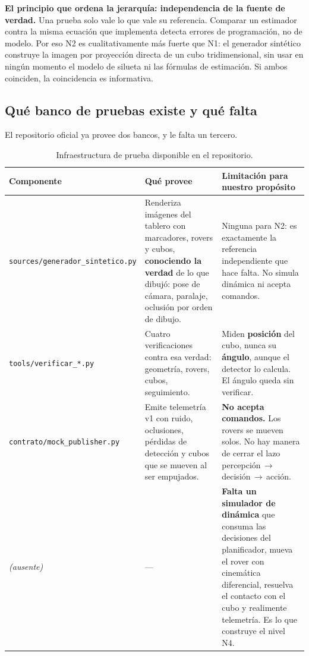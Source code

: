 \documentclass[11pt,a4paper]{article}
\begin{document}
\begin{tcolorbox}[colback=black!3,colframe=black!50,boxrule=0.5pt,arc=1pt]
\textbf{El principio que ordena la jerarquía: independencia de la fuente de verdad.}
Una prueba solo vale lo que vale su referencia. Comparar un estimador contra la misma
ecuación que implementa detecta errores de programación, no de modelo. Por eso N2 es
cualitativamente más fuerte que N1: el generador sintético construye la imagen por
proyección directa de un cubo tridimensional, sin usar en ningún momento el modelo de
silueta ni las fórmulas de estimación. Si ambos coinciden, la coincidencia es
informativa.
\end{tcolorbox}

\subsection{Qué banco de pruebas existe y qué falta}

El repositorio oficial ya provee dos bancos, y le falta un tercero.

\begin{table}[htbp]
\centering
\small
\caption{Infraestructura de prueba disponible en el repositorio.}
\begin{tabular}{p{3.6cm}p{4.3cm}p{6.4cm}}
\toprule
Componente & Qué provee & Limitación para nuestro propósito \\
\midrule
\texttt{sources/gene\-rador\_sintetico.py} &
Renderiza imágenes del tablero con marcadores, rovers y cubos, \textbf{conociendo la
verdad} de lo que dibujó: pose de cámara, paralaje, oclusión por orden de dibujo. &
Ninguna para N2: es exactamente la referencia independiente que hace falta. No
simula dinámica ni acepta comandos. \\
\addlinespace
\texttt{tools/verificar\_*.py} &
Cuatro verificaciones contra esa verdad: geometría, rovers, cubos, seguimiento. &
Miden \textbf{posición} del cubo, nunca su \textbf{ángulo}, aunque el detector lo
calcula. El ángulo queda sin verificar. \\
\addlinespace
\texttt{contrato/mock\_pu\-blisher.py} &
Emite telemetría v1 con ruido, oclusiones, pérdidas de detección y cubos que se
mueven al ser empujados. & \textbf{No acepta comandos.} Los rovers se mueven solos.
No hay manera de cerrar el lazo percepción$\,\to\,$decisión$\,\to\,$acción. \\
\addlinespace
\textit{(ausente)} & --- &
\textbf{Falta un simulador de dinámica} que consuma las decisiones del planificador,
mueva el rover con cinemática diferencial, resuelva el contacto con el cubo y
realimente telemetría. Es lo que construye el nivel N4. \\
\bottomrule
\end{tabular}
\label{tab:infra}
\end{table}
\end{document}
